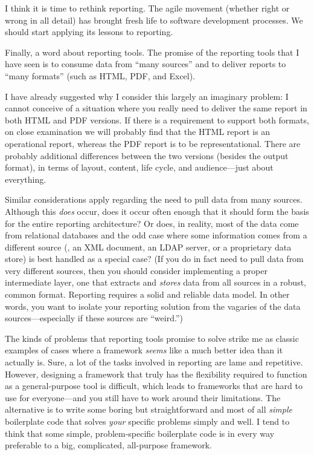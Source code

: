 I think it is time to rethink reporting. The agile movement (whether
right or wrong in all detail) has brought fresh life to software
development processes. We should start applying its lessons to
reporting.

Finally, a word about reporting tools. The promise of the reporting
tools that I have seen is to consume data from ``many sources'' and to
deliver reports to ``many formats'' (such as HTML, PDF, and Excel).

I have already suggested why I consider this largely an imaginary
problem: I cannot conceive of a situation where you really need to
deliver the same report in both HTML and PDF versions. If there is a
requirement to support both formats, on close examination we will
probably find that the HTML report is an operational report, whereas
the PDF report is to be representational. There are probably additional
differences between the two versions (besides the output format), in
terms of layout, content, life cycle, and audience---just about
everything.

Similar considerations apply regarding the need to pull data from
many sources. Although this \emph{does} occur, does it occur often
enough that it should form the basis for the entire reporting
architecture? Or does, in reality, most of the data come from
relational databases and the odd case where some information comes
from a different source (\eg, an XML document, an LDAP server, or a
proprietary data store) is best handled as a special case?  (If you do
in fact need to pull data from very different sources, then you should
consider implementing a proper intermediate layer, one that extracts
and \emph{stores} data from all sources in a robust, common format.
Reporting requires a solid and reliable data model.  In other words,
you want to isolate your reporting solution from the vagaries of the
data sources---especially if these sources are ``weird.'')

The kinds of problems that reporting tools promise to solve strike me
as classic examples of cases where a framework \emph{seems} like a
much better idea than it actually is. Sure, a lot of the tasks
involved in reporting are lame and repetitive. However, designing a
framework that truly has the flexibility required to function as a
general-purpose tool is difficult, which leads to frameworks that are
hard to use for everyone---and you still have to work around their
limitations.  The alternative is to write some boring but
straightforward and most of all \emph{simple} boilerplate code that
solves \emph{your} specific problems simply and well. I tend to think
that some simple, problem-specific boilerplate code is in every way
preferable to a big, complicated, all-purpose framework.


